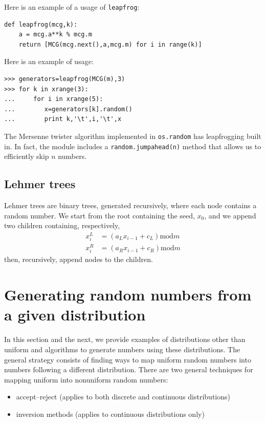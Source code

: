 \documentclass[justified,sixbynine]{tufte-book}
\def\ft{\small\tt}
\theoremstyle{plain}%
\theoremstyle{definition}
\theoremstyle{remark}
\begin{document}
\begin{fullwidth}
Here is an example of a usage of {\ft leapfrog}:

\begin{lstlisting}[caption={in file: {\ft nlib.py}}]
def leapfrog(mcg,k):
    a = mcg.a**k % mcg.m
    return [MCG(mcg.next(),a,mcg.m) for i in range(k)]
\end{lstlisting}

Here is an example of usage:
\begin{lstlisting}
>>> generators=leapfrog(MCG(m),3)
>>> for k in xrange(3):
...     for i in xrange(5):
...        x=generators[k].random()
...        print k,'\t',i,'\t',x
\end{lstlisting}

The Mersenne twister algorithm implemented in {\ft os.random} has leapfrogging built in. In fact, the module includes a {\ft random.jumpahead(n)} method that allows us to efficiently skip $n$ numbers.

\goodbreak\subsection{Lehmer trees}

Lehmer trees are binary trees, generated recursively, where each node
contains a random number. We start from the root containing the seed, $x_0$, and
we append two children containing, respectively,
\begin{align}
x_i^L &= (a_Lx_{i-1}+c_L)\textrm{mod}m \\
x_i^R &= (a_Rx_{i-1}+c_R)\textrm{mod}m
\end{align}
then, recursively, append nodes to the children.

\goodbreak\section{Generating random numbers from a given distribution}


In this section and the next, we provide examples of distributions other than uniform and algorithms to generate numbers using these distributions. The general strategy consists of finding ways to map uniform random numbers into numbers following a different distribution. There are two general techniques for mapping uniform into nonuniform random numbers:

\begin{itemize}
\item accept--reject (applies to both discrete and continuous distributions)
\item inversion methods (applies to continuous distributions only)
\end{itemize}


\end{fullwidth}
\end{document}
